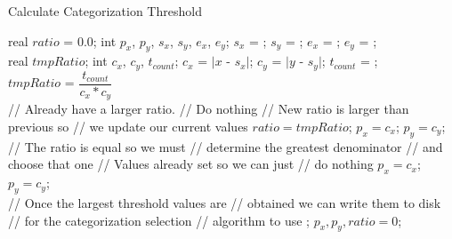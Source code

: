 \begin{algorithm}
\caption{Calculate Categorization Threshold}
\label{alg:calc_threshold}
\begin{algorithmic}[1]

   \label{l:each_cat}
    \State real $ratio$ = 0.0;
    \State int $p_x$, $p_y$, $s_x$, $s_y$, $e_x$, $e_y$;
    \State $s_x$ = ; \label{l:getstart}
    \State $s_y$ = ;
    \State $e_x$ = ;
    \State $e_y$ = ; \label{l:getend}
    \\
     \label{l:forx}
       \label{l:fory}
        \State real $tmpRatio$;
        \State int $c_x$, $c_y$, $t_{count}$;
        \State $c_x$ = $|x$ - $s_x|$; \label{l:absx}
        \State $c_y$ = $|y$ - $s_y|$; \label{l:absy}
        \State $t_{count}$ = ; \label{l:numtcount}
        \\
        \State $tmpRatio$ = $\dfrac{t_{count}}{c_x * c_y}$ \label{l:tmpratio}
        \\
         \label{l:comparestart}
        \State // Already have a larger ratio.
        \State // Do nothing
        \State // New ratio is larger than previous so
        \State // we update our current values
        \State $ratio = tmpRatio$; \label{l:ratiohigher_start}
        \State $p_x = c_x$;
        \State $p_y = c_y$;\label{l:ratiohigher_end}
        \Else \label{l:equalstart}
        \State // The ratio is equal so we must
        \State // determine the greatest denominator
        \State // and choose that one
        \State // Values already set so we can just
        \State // do nothing
        \Else
        \State $p_x = c_x$;
        \State $p_y = c_y$;
        \EndIf
        \EndIf \label{l:compareend}
      \EndFor
    \EndFor
    \\
    \State // Once the largest threshold values are 
    \State // obtained we can write them to disk
    \State // for the categorization selection 
    \State // algorithm to use
    \State {}; \label{l:writetodb}
    \State $p_x, p_y, ratio = 0$; \label{l:reset}
  \EndFor
 \EndProcedure

\end{algorithmic}
\end{algorithm}

